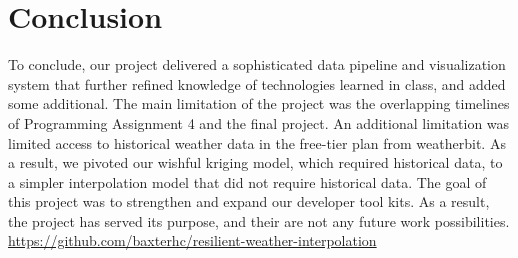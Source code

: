 \section{Conclusion}
To conclude, our project delivered a sophisticated data pipeline and visualization system that further refined knowledge of technologies learned in class, and added some additional.
The main limitation of the project was the overlapping timelines of Programming Assignment 4 and the final project.
An additional limitation was limited access to historical weather data in the free-tier plan from weatherbit. 
As a result, we pivoted our wishful kriging model, which required historical data,
to a simpler interpolation model that did not require historical data.
The goal of this project was to strengthen and expand our developer tool kits. 
As a result, the project has served its purpose, and their are not any future work possibilities.
\url{https://github.com/baxterhc/resilient-weather-interpolation}